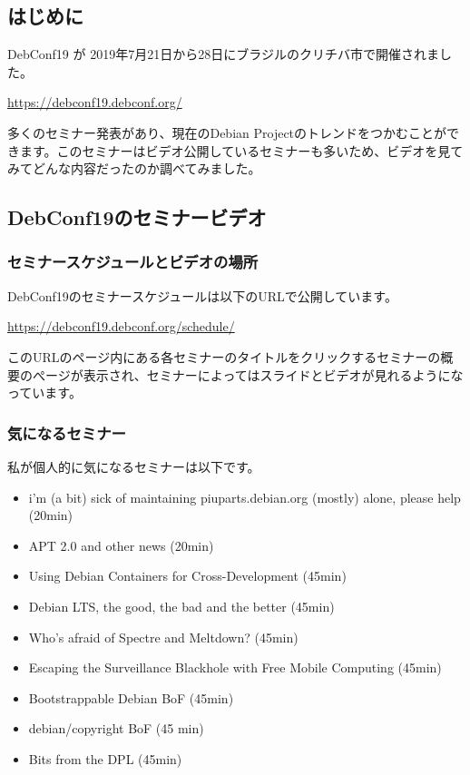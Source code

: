 \documentclass[mingoth,a4paper]{jsarticle}
\begin{document}


\subsection{はじめに}

DebConf19 が 2019年7月21日から28日にブラジルのクリチバ市で開催されました。

\url{https://debconf19.debconf.org/}

多くのセミナー発表があり、現在のDebian Projectのトレンドをつかむことができます。このセミナーはビデオ公開しているセミナーも多いため、ビデオを見てみてどんな内容だったのか調べてみました。

\subsection{DebConf19のセミナービデオ}

\subsubsection{セミナースケジュールとビデオの場所}

DebConf19のセミナースケジュールは以下のURLで公開しています。

\url{https://debconf19.debconf.org/schedule/}

このURLのページ内にある各セミナーのタイトルをクリックするセミナーの概要のぺージが表示され、セミナーによってはスライドとビデオが見れるようになっています。


\subsubsection{気になるセミナー}

私が個人的に気になるセミナーは以下です。

\begin{itemize}
\item i'm (a bit) sick of maintaining piuparts.debian.org (mostly) alone, please help (20min)
\item APT 2.0 and other news (20min)
\item Using Debian Containers for Cross-Development (45min)
\item Debian LTS, the good, the bad and the better (45min)
\item Who's afraid of Spectre and Meltdown? (45min)
\item Escaping the Surveillance Blackhole with Free Mobile Computing (45min)
\item Bootstrappable Debian BoF (45min)
\item debian/copyright BoF (45 min)
\item Bits from the DPL (45min)
\end{itemize}
\end{document}
